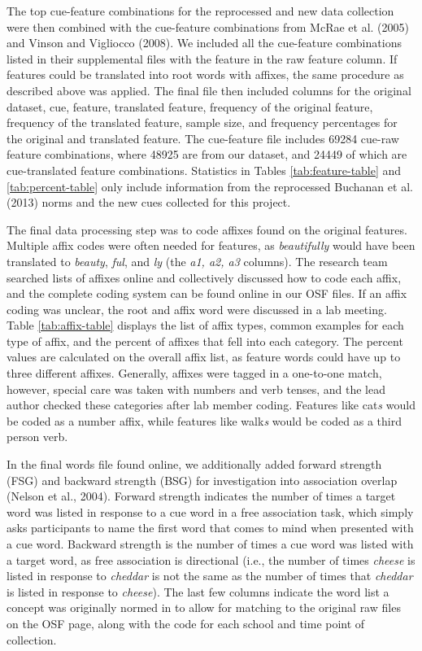\documentclass[english,,man]{apa6}
\theoremstyle{definition}
\theoremstyle{definition}
\theoremstyle{definition}
\theoremstyle{remark}
\begin{document}
The top cue-feature combinations for the reprocessed and new data
collection were then combined with the cue-feature combinations from
McRae et al. (2005) and Vinson and Vigliocco (2008). We included all the
cue-feature combinations listed in their supplemental files with the
feature in the raw feature column. If features could be translated into
root words with affixes, the same procedure as described above was
applied. The final file then included columns for the original dataset,
cue, feature, translated feature, frequency of the original feature,
frequency of the translated feature, sample size, and frequency
percentages for the original and translated feature. The cue-feature
file includes 69284 cue-raw feature combinations, where 48925 are from
our dataset, and 24449 of which are cue-translated feature combinations.
Statistics in Tables \ref{tab:feature-table} and \ref{tab:percent-table}
only include information from the reprocessed Buchanan et al. (2013)
norms and the new cues collected for this project.

The final data processing step was to code affixes found on the original
features. Multiple affix codes were often needed for features, as
\emph{beautifully} would have been translated to \emph{beauty},
\emph{ful}, and \emph{ly} (the \emph{a1, a2, a3} columns). The research
team searched lists of affixes online and collectively discussed how to
code each affix, and the complete coding system can be found online in
our OSF files. If an affix coding was unclear, the root and affix word
were discussed in a lab meeting. Table \ref{tab:affix-table} displays
the list of affix types, common examples for each type of affix, and the
percent of affixes that fell into each category. The percent values are
calculated on the overall affix list, as feature words could have up to
three different affixes. Generally, affixes were tagged in a one-to-one
match, however, special care was taken with numbers and verb tenses, and
the lead author checked these categories after lab member coding.
Features like cat\emph{s} would be coded as a number affix, while
features like walk\emph{s} would be coded as a third person verb.

In the final words file found online, we additionally added forward
strength (FSG) and backward strength (BSG) for investigation into
association overlap (Nelson et al., 2004). Forward strength indicates
the number of times a target word was listed in response to a cue word
in a free association task, which simply asks participants to name the
first word that comes to mind when presented with a cue word. Backward
strength is the number of times a cue word was listed with a target
word, as free association is directional (i.e., the number of times
\emph{cheese} is listed in response to \emph{cheddar} is not the same as
the number of times that \emph{cheddar} is listed in response to
\emph{cheese}). The last few columns indicate the word list a concept
was originally normed in to allow for matching to the original raw files
on the OSF page, along with the code for each school and time point of
collection.
\end{document}
